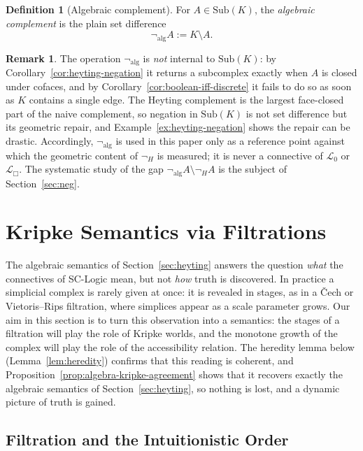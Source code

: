 \documentclass[final,12pt]{elsarticle}
\theoremstyle{plain}
\theoremstyle{definition}
\newtheorem{defi}[thm]{Definition}
\newtheorem{rem}[thm]{Remark}
\begin{document}
\begin{defi}[Algebraic complement]
\label{def:algebraic-negation}
For \(A \in \mathrm{Sub}(K)\), the \emph{algebraic complement} is the plain set
difference
\[
  \neg_{\mathrm{alg}} A := K \setminus A .
\]
\end{defi}

\begin{rem}
\label{rem:alg-vs-heyting}
The operation \(\neg_{\mathrm{alg}}\) is \emph{not} internal to
\(\mathrm{Sub}(K)\): by Corollary~\ref{cor:heyting-negation} it returns a
subcomplex exactly when \(A\) is closed under cofaces, and by
Corollary~\ref{cor:boolean-iff-discrete} it fails to do so as soon as \(K\)
contains a single edge. The Heyting complement is the largest face-closed part
of the naive complement, so negation in \(\mathrm{Sub}(K)\) is not set difference
but its geometric repair, and Example~\ref{ex:heyting-negation} shows the repair
can be drastic. Accordingly, \(\neg_{\mathrm{alg}}\) is used in this paper only
as a reference point against which the geometric content of \(\neg_H\) is
measured; it is never a connective of \(\mathcal{L}_0\) or \(\mathcal{L}_\Box\).
The systematic study of the gap
\(\neg_{\mathrm{alg}} A \setminus \neg_H A\) is the subject of
Section~\ref{sec:neg}.
\end{rem}


\section{Kripke Semantics via Filtrations}
\label{sec:kripke}

The algebraic semantics of Section~\ref{sec:heyting} answers the question
\emph{what} the connectives of SC-Logic mean, but not \emph{how} truth is
discovered. In practice a simplicial complex is rarely given at once: it is
revealed in stages, as in a {\v C}ech or Vietoris--Rips filtration, where simplices
appear as a scale parameter grows. Our aim in this section is to turn this
observation into a semantics: the stages of a filtration will play the role of
Kripke worlds, and the monotone growth of the complex will play the role of the
accessibility relation. The heredity lemma below (Lemma~\ref{lem:heredity})
confirms that this reading is coherent, and
Proposition~\ref{prop:algebra-kripke-agreement} shows that it recovers exactly
the algebraic semantics of Section~\ref{sec:heyting}, so nothing is lost,
and a dynamic picture of truth is gained.

\subsection{Filtration and the Intuitionistic Order}
\label{subsec:filtration-order}
\end{document}

